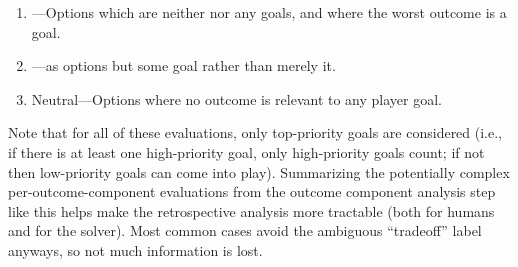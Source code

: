 \begin{enumerate}[leftmargin=1.4em]
\begin{enumerate}
\item {}---Options which are neither  nor  any goals, and where the worst outcome is  a goal.
\item {}---as  options but  some goal rather than merely  it.
\item Neutral---Options where no outcome is relevant to any player goal.
\end{enumerate}
%
Note that for all of these evaluations, only top-priority goals are considered (i.e., if there is at least one high-priority goal, only high-priority goals count; if not then low-priority goals can come into play).
%
Summarizing the potentially complex per-outcome-component evaluations from the outcome component analysis step like this helps make the retrospective analysis more tractable (both for humans and for the solver).
%
Most common cases avoid the ambiguous ``tradeoff'' label anyways, so not much information is lost.


\begin{figure}[!p]
\centering
{}
\end{figure}
\end{enumerate}
